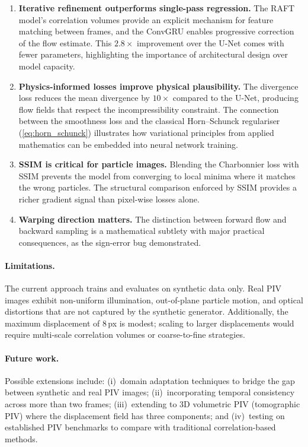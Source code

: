 \documentclass[11pt, a4paper]{article}
\begin{document}
\begin{enumerate}
    \item \textbf{Iterative refinement outperforms single-pass regression.}
    The RAFT model's correlation volumes provide an explicit mechanism for feature matching between frames, and the ConvGRU enables progressive correction of the flow estimate.
    This $2.8\times$ improvement over the U-Net comes with fewer parameters, highlighting the importance of architectural design over model capacity.

    \item \textbf{Physics-informed losses improve physical plausibility.}
    The divergence loss reduces the mean divergence by $10\times$ compared to the U-Net, producing flow fields that respect the incompressibility constraint.
    The connection between the smoothness loss and the classical Horn--Schunck regulariser (\cref{eq:horn_schunck}) illustrates how variational principles from applied mathematics can be embedded into neural network training.

    \item \textbf{SSIM is critical for particle images.}
    Blending the Charbonnier loss with SSIM prevents the model from converging to local minima where it matches the wrong particles.
    The structural comparison enforced by SSIM provides a richer gradient signal than pixel-wise losses alone.

    \item \textbf{Warping direction matters.}
    The distinction between forward flow and backward sampling is a mathematical subtlety with major practical consequences, as the sign-error bug demonstrated.
\end{enumerate}

\paragraph{Limitations.}
The current approach trains and evaluates on synthetic data only.
Real PIV images exhibit non-uniform illumination, out-of-plane particle motion, and optical distortions that are not captured by the synthetic generator.
Additionally, the maximum displacement of 8\,px is modest; scaling to larger displacements would require multi-scale correlation volumes or coarse-to-fine strategies.

\paragraph{Future work.}
Possible extensions include:
(i)~domain adaptation techniques to bridge the gap between synthetic and real PIV images;
(ii)~incorporating temporal consistency across more than two frames;
(iii)~extending to 3D volumetric PIV (tomographic PIV) where the displacement field has three components;
and (iv)~testing on established PIV benchmarks to compare with traditional correlation-based methods.
\end{document}
